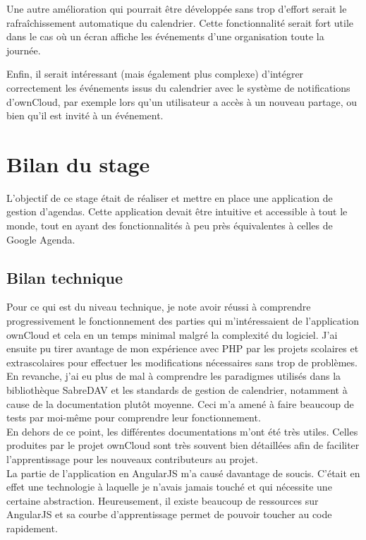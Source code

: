 \documentclass[10pt,a4paper, twoside]{report}
\begin{document}
	Une autre amélioration qui pourrait être développée sans trop d'effort serait le rafraîchissement automatique du calendrier. Cette fonctionnalité serait fort utile dans le cas où un écran affiche les événements d'une organisation toute la journée.
	
	Enfin, il serait intéressant (mais également plus complexe) d'intégrer correctement les événements issus du calendrier avec le système de notifications d'ownCloud, par exemple lors qu'un utilisateur a accès à un nouveau partage, ou bien qu'il est invité à un événement.
	
	\newpage\null\thispagestyle{empty}\newpage
	\chapter{Bilan du stage}
	L'objectif de ce stage était de réaliser et mettre en place une application de gestion d'agendas. Cette application devait être intuitive et accessible à tout le monde, tout en ayant des fonctionnalités à peu près équivalentes à celles de Google Agenda.
	\section{Bilan technique}
	Pour ce qui est du niveau technique, je note avoir réussi à comprendre progressivement le fonctionnement des parties qui m'intéressaient de l'application ownCloud et cela en un temps minimal malgré la complexité du logiciel. J'ai ensuite pu tirer avantage de mon expérience avec PHP par les projets scolaires et extrascolaires pour effectuer les modifications nécessaires sans trop de problèmes.
	\\
	
	En revanche, j'ai eu plus de mal à comprendre les paradigmes utilisés dans la bibliothèque SabreDAV et les standards de gestion de calendrier, notamment à cause de la documentation plutôt moyenne. Ceci m'a amené à faire beaucoup de tests par moi-même pour comprendre leur fonctionnement.
	\\
	
	En dehors de ce point, les différentes documentations m'ont été très utiles. Celles produites par le projet ownCloud sont très souvent bien détaillées afin de faciliter l'apprentissage pour les nouveaux contributeurs au projet.
	\\
	
	La partie de l'application en AngularJS m'a causé davantage de soucis. C'était en effet une technologie à laquelle je n'avais jamais touché et qui nécessite une certaine abstraction. Heureusement, il existe beaucoup de ressources sur AngularJS et sa courbe d'apprentissage permet de pouvoir toucher au code rapidement.
	
\end{document}
